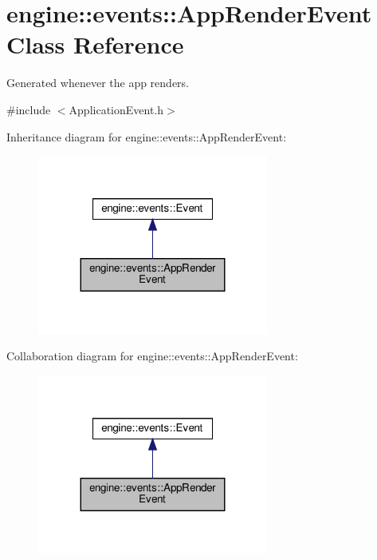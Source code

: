 \hypertarget{classengine_1_1events_1_1AppRenderEvent}{}\section{engine\+:\+:events\+:\+:App\+Render\+Event Class Reference}
\label{classengine_1_1events_1_1AppRenderEvent}


Generated whenever the app renders.  




{\ttfamily \#include $<$Application\+Event.\+h$>$}



Inheritance diagram for engine\+:\+:events\+:\+:App\+Render\+Event\+:\nopagebreak
\begin{figure}[H]
\begin{center}
\leavevmode
\includegraphics[width=215pt]{classengine_1_1events_1_1AppRenderEvent__inherit__graph}
\end{center}
\end{figure}


Collaboration diagram for engine\+:\+:events\+:\+:App\+Render\+Event\+:\nopagebreak
\begin{figure}[H]
\begin{center}
\leavevmode
\includegraphics[width=215pt]{classengine_1_1events_1_1AppRenderEvent__coll__graph}
\end{center}
\end{figure}
